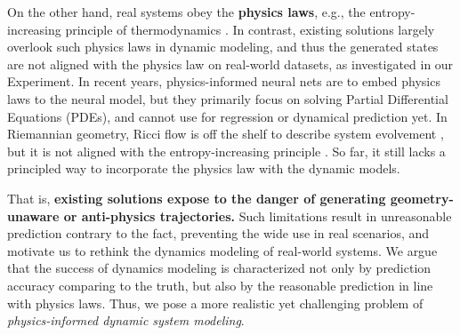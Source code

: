 On the other hand, real systems obey the \textbf{physics laws}, e.g., the entropy-increasing principle of thermodynamics \cite{mackey1989}.
In contrast, existing solutions largely overlook such physics laws in dynamic modeling, 
and thus the generated states are not aligned with the physics law on real-world datasets, as investigated in our Experiment.
In recent years, physics-informed neural nets \cite{liu24,nips22PNNPDE} are to embed physics laws to the neural model, 
but they primarily focus on solving Partial Differential Equations (PDEs), 
and cannot use for regression or dynamical prediction yet.
In Riemannian geometry, Ricci flow is off the shelf to describe system evolvement \cite{Bai20,Ollivier2007}, 
but it is not aligned with the entropy-increasing principle  \cite{baptista2024}.
So far, it still lacks a principled way to incorporate the physics law with the dynamic models.


That is, \textbf{existing solutions expose to the danger of generating geometry-unaware or anti-physics trajectories.}
Such limitations result in unreasonable prediction contrary to the fact, preventing the wide use in real scenarios, 
and motivate us to rethink the dynamics modeling of real-world systems.
We argue that the success of dynamics modeling is characterized not only by prediction accuracy comparing to the truth, but also by the reasonable prediction in line with physics laws.
Thus, we pose a more realistic yet challenging problem of \emph{physics-informed dynamic system modeling}.




